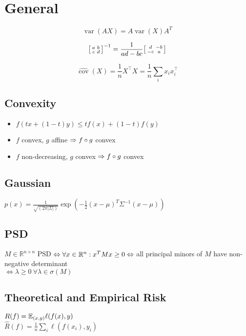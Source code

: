 \section*{General}

$$
\operatorname{var}(AX)=A\operatorname{var}(X)A^T
$$

$$
\begin{bsmallmatrix}
a&b \\ 
c&d
\end{bsmallmatrix}^{-1}=\frac{1}{ad-bc}
\begin{bsmallmatrix}
d&-b \\ 
-c&a
\end{bsmallmatrix}
$$

$$
\widehat{\operatorname{cov}}(X)=\frac{1}{n}X^\top X=\frac{1}{n}\sum_i x_ix_i^\top
$$

\subsection*{Convexity}
\begin{itemize}
    \item{$f(t x + (1-t)y) \leq t f(x) + (1-t) f(y)$}
    \item{$f$ convex, $g$ affine $\Rightarrow f\circ g$ convex}
    \item{$f$ non-decreasing, $g$ convex $\Rightarrow f\circ g$ convex}
\end{itemize}

\subsection*{Gaussian}

$p(x) = \frac{1}{\sqrt{(2\pi|\Sigma|)}}\exp({-\frac{1}{2}(x-\mu)^T\Sigma^{-1}(x-\mu)})$

\subsection*{PSD}
$M \in \mathbb{R}^{n\times n}$ PSD $\Leftrightarrow \forall x \in \mathbb{R}^n: x^TMx \geq 0 \\
\Leftrightarrow$ all principal minors of $M$ have non-negative determinant\\
$\Leftrightarrow \lambda \geq 0 \ \forall \lambda\in\sigma(M)$

\subsection*{Theoretical and Empirical Risk}
$R(f)=\mathbb{E}_{(x,y)}\ell(f(x), y)$ \\ $\hat{R}(f)=\frac{1}{n}\sum_i\ell(f(x_i), y_i)$
